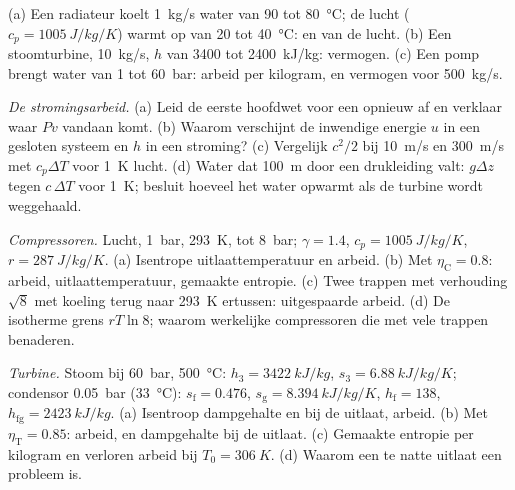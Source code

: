 \begin{exercise}[$\star$]\label{exo:b2:open-systems:4}
(a) Een radiateur koelt \qty{1}{kg/s} water van \qty{90}{} tot \qty{80}{\celsius};
de lucht ($c_p = \qty{1005}{J/kg/K}$) warmt op van \qty{20}{} tot
\qty{40}{\celsius}:
 en  van de lucht. (b) Een stoomturbine, \qty{10}{kg/s},
$h$ van \qty{3400}{} tot \qty{2400}{kJ/kg}: vermogen. (c) Een pomp brengt
water van \qty{1}{} tot \qty{60}{bar}: arbeid per kilogram, en vermogen voor
\qty{500}{kg/s}.
\end{exercise}

\begin{exercise}[$\star\star$]\label{exo:b2:open-systems:5}
\emph{De stromingsarbeid.} (a) Leid de eerste hoofdwet voor een 
opnieuw af en
verklaar waar $Pv$ vandaan komt. (b) Waarom verschijnt de inwendige energie $u$
in een gesloten systeem en $h$ in een stroming? (c) Vergelijk $c^2/2$ bij
\qty{10}{m/s} en \qty{300}{m/s} met $c_p\Delta T$ voor \qty{1}{K} lucht.
(d) Water dat \qty{100}{m} door een drukleiding valt: $g\Delta z$ tegen
$c\,\Delta T$ voor \qty{1}{K}; besluit hoeveel het water opwarmt als de
turbine wordt weggehaald.
\end{exercise}

\begin{exercise}[$\star\star$]\label{exo:b2:open-systems:6}
\emph{Compressoren.} Lucht, \qty{1}{bar}, \qty{293}{K}, tot \qty{8}{bar};
$\gamma =
1.4$, $c_p = \qty{1005}{J/kg/K}$, $r = \qty{287}{J/kg/K}$. (a)
Isentrope
uitlaattemperatuur en arbeid. (b) Met $\eta_{\text{C}} = 0.8$: arbeid,
uitlaat\-temperatuur,
gemaakte entropie. (c) Twee trappen met verhouding $\sqrt8$ met
koeling terug naar \qty{293}{K} ertussen: uitgespaarde arbeid. (d) De isotherme
grens $rT\ln 8$; waarom werkelijke compressoren die met vele trappen benaderen.
\end{exercise}

\begin{exercise}[$\star\star$]\label{exo:b2:open-systems:7}
\emph{Turbine.} Stoom bij \qty{60}{bar}, \qty{500}{\celsius}:
$h_3 = \qty{3422}{kJ/kg}$,
$s_3 = \qty{6.88}{kJ/kg/K}$; condensor \qty{0.05}{bar} (\qty{33}{\celsius}):
$s_{\text{f}} = 0.476$, $s_{\text{g}} = \qty{8.394}{kJ/kg/K}$, $h_{\text{f}} = 138$,
$h_{\text{fg}} = \qty{2423}{kJ/kg}$. (a) Isentroop dampgehalte en  bij de
uitlaat, arbeid. (b) Met $\eta_{\text{T}} = 0.85$: arbeid,  en dampgehalte
bij de uitlaat. (c) Gemaakte entropie per kilogram en verloren arbeid bij
$T_0 =
\qty{306}{K}$. (d) Waarom een te natte uitlaat een probleem is.
\end{exercise}

